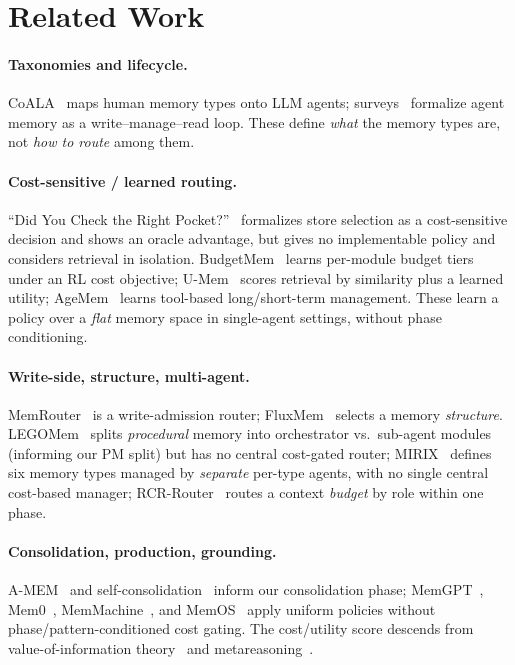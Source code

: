 \documentclass[10pt,twocolumn]{article}
\begin{document}
\section{Related Work}
\paragraph{Taxonomies and lifecycle.} CoALA~\cite{coala} maps human memory types
onto LLM agents; surveys~\cite{survey1,survey2} formalize agent memory as a
write--manage--read loop. These define \emph{what} the memory types are, not
\emph{how to route} among them.

\paragraph{Cost-sensitive / learned routing.} ``Did You Check the Right
Pocket?''~\cite{pocket} formalizes store selection as a cost-sensitive decision
and shows an oracle advantage, but gives no implementable policy and considers
retrieval in isolation. BudgetMem~\cite{budgetmem} learns per-module budget tiers
under an RL cost objective; U-Mem~\cite{umem} scores retrieval by similarity plus
a learned utility; AgeMem~\cite{agemem} learns tool-based long/short-term
management. These learn a policy over a \emph{flat} memory space in single-agent
settings, without phase conditioning.

\paragraph{Write-side, structure, multi-agent.} MemRouter~\cite{memrouter} is a
write-admission router; FluxMem~\cite{fluxmem} selects a memory \emph{structure}.
LEGOMem~\cite{legomem} splits \emph{procedural} memory into orchestrator vs.\
sub-agent modules (informing our PM split) but has no central cost-gated router;
MIRIX~\cite{mirix} defines six memory types managed by \emph{separate} per-type
agents, with no single central cost-based manager; RCR-Router~\cite{rcr} routes a
context \emph{budget} by role within one phase.

\paragraph{Consolidation, production, grounding.} A-MEM~\cite{amem} and
self-consolidation~\cite{selfcons} inform our consolidation phase;
MemGPT~\cite{memgpt}, Mem0~\cite{mem0}, MemMachine~\cite{memmachine}, and
MemOS~\cite{memos} apply uniform policies without phase/pattern-conditioned cost
gating. The cost/utility score descends from value-of-information
theory~\cite{voi} and metareasoning~\cite{meta}.
\end{document}
